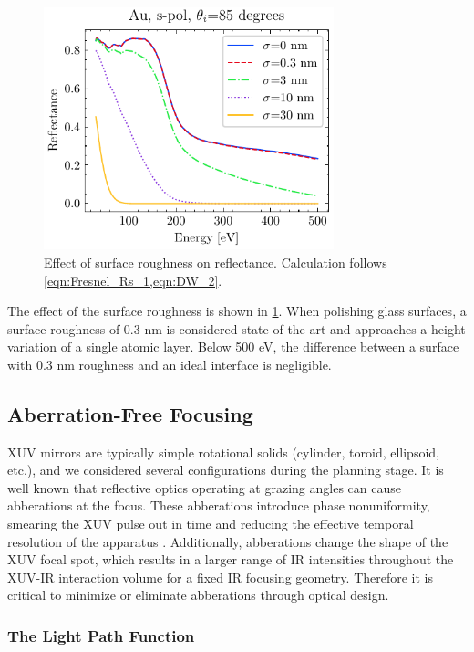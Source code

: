 \begin{figure}
	\centering
	\includegraphics[width=0.75\textwidth]{figures/chap2/R_vs_roughness.pdf}
	\caption{Effect of surface roughness on reflectance. Calculation follows \cref{eqn:Fresnel_Rs_1,eqn:DW_2}.}
	\label{fig:R_vs_roughness}
\end{figure}

The effect of the surface roughness is shown in \cref{fig:R_vs_roughness}. When polishing glass surfaces, a surface roughness of 0.3 nm is considered state of the art and approaches a height variation of a single atomic layer. Below 500 eV, the difference between a surface with 0.3 nm roughness and an ideal interface is negligible. 

\subsection{Aberration-Free Focusing}

XUV mirrors are typically simple rotational solids (cylinder, toroid, ellipsoid, etc.), and we considered several configurations during the planning stage. It is well known that reflective optics operating at grazing angles can cause abberations at the focus. These abberations introduce phase nonuniformity, smearing the XUV pulse out in time and reducing the effective temporal resolution of the apparatus \cite{bourassin-bouchetHowFocusAttosecond2013}. Additionally, abberations change the shape of the XUV focal spot, which results in a larger range of IR intensities throughout the XUV-IR interaction volume for a fixed IR focusing geometry. Therefore it is critical to minimize or eliminate abberations through optical design.

\subsubsection{The Light Path Function}


